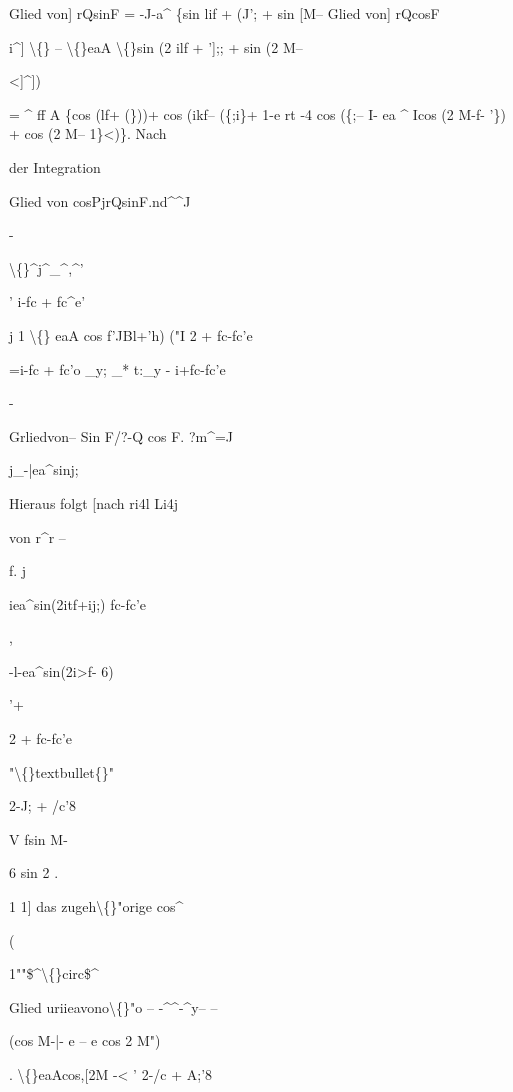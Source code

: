 \documentclass[10pt,a4paper]{article}
\begin{document}

Glied von] rQsinF
= -J-a\textasciicircum{} \{sin lif + (J'; + sin [M--
Glied von] rQcosF

i\textasciicircum{}] \textbackslash\{\} -- \textbackslash\{\}eaA \textbackslash\{\}sin (2 ilf + '];; + sin (2 M--

<]\textasciicircum{}])

= \textasciicircum{} ff A \{cos (lf+ (\}))+ cos (ikf-- (\{;i\}+ 1-e rt -4 cos (\{;-- I- ea \textasciicircum{} Icos (2 M-f- '\}) + cos (2 M-- 1\}<)\}.
Nach

der Integration

Glied von cosPjrQsinF.nd\textasciicircum{}\textasciicircum{}J

-

\textbackslash\{\}\textasciicircum{}j\textasciicircum{}\_\textasciicircum{},\textasciicircum{}'

' i-fc + fc\textasciicircum{}e'

j 1 \textbackslash\{\} eaA cos f'JBl+'h)
("I 2 + fc-fc'e

=i-fc + fc'o \_y;
\_* t:\_y
- i+fc-fc'e

-

Grliedvon-- Sin F/?-Q cos F. ?m\textasciicircum{}=J

j\_-|ea\textasciicircum{}sinj;

Hieraus folgt [nach
ri4l
Li4j

von r\textasciicircum{}r --

f.
j

iea\textasciicircum{}sin(2itf+ij;)
fc-fc'e

,

-l-ea\textasciicircum{}sin(2i>f- 6)

'+

2 + fc-fc'e

"\textbackslash\{\}textbullet\{\}"

2-J; + /c'8

V fsin M-

6 sin 2 .

1 1] das zugeh\textbackslash\{\}"orige
cos\textasciicircum{}

(

1""\$\textasciicircum{}\textbackslash\{\}circ\$\textasciicircum{}

Glied
uriieavono\textbackslash\{\}"o
-- -\textasciicircum{}\textasciicircum{}-\textasciicircum{}y-- --

(cos M-|- e -- e cos 2 M")

. \textbackslash\{\}eaAcos,[2M -<
'
2-/c + A;'8
\end{document}
